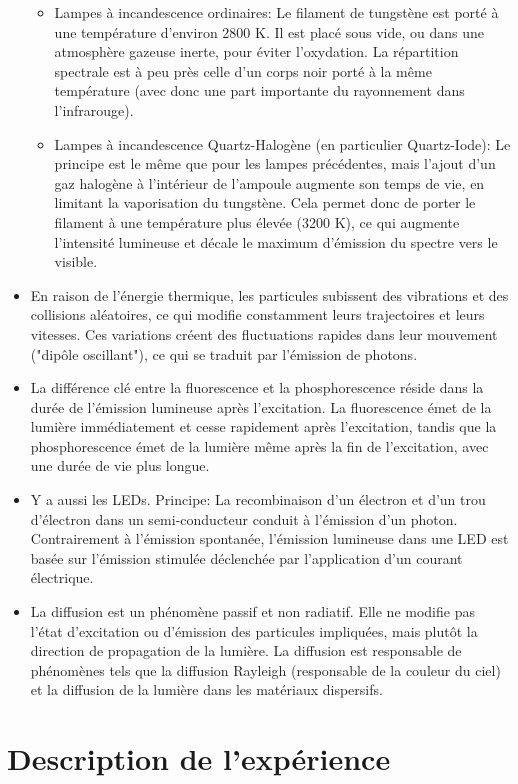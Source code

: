 \documentclass[11pt]{report}
\numberwithin{figure}{section}
\numberwithin{equation}{section}
\numberwithin{table}{section}
\newcommand{\1}{\boldsymbol{1}}
\begin{document}
\begin{itemize}
\begin{itemize}
\item Lampes à incandescence ordinaires: Le filament de tungstène est porté à une température d’environ 2800 K. Il est placé sous vide, ou dans une atmosphère gazeuse inerte, pour éviter l’oxydation. La répartition spectrale est à peu près celle d’un corps noir porté à la même température (avec donc une part importante du rayonnement dans l’infrarouge).
\item Lampes à incandescence Quartz-Halogène (en particulier Quartz-Iode): Le principe est le même que pour les lampes précédentes, mais l’ajout d’un gaz halogène à l’intérieur de l’ampoule augmente son temps de vie, en limitant la vaporisation du tungstène. Cela permet donc de porter le filament à une température plus élevée (3200 K), ce qui augmente l’intensité lumineuse et décale le maximum d’émission du spectre vers le visible.
\end{itemize}
\item En raison de l'énergie thermique, les particules subissent des vibrations et des collisions aléatoires, ce qui modifie constamment leurs trajectoires et leurs vitesses. Ces variations créent des fluctuations rapides dans leur mouvement ("dipôle oscillant"), ce qui se traduit par l'émission de photons.
\item La différence clé entre la fluorescence et la phosphorescence réside dans la durée de l'émission lumineuse après l'excitation. La fluorescence émet de la lumière immédiatement et cesse rapidement après l'excitation, tandis que la phosphorescence émet de la lumière même après la fin de l'excitation, avec une durée de vie plus longue.
\item Y a aussi les LEDs. Principe: La recombinaison d'un électron et d'un trou d'électron dans un semi-conducteur conduit à l'émission d'un photon. Contrairement à l'émission spontanée, l'émission lumineuse dans une LED est basée sur l'émission stimulée déclenchée par l'application d'un courant électrique.
\item La diffusion est un phénomène passif et non radiatif. Elle ne modifie pas l'état d'excitation ou d'émission des particules impliquées, mais plutôt la direction de propagation de la lumière. La diffusion est responsable de phénomènes tels que la diffusion Rayleigh (responsable de la couleur du ciel) et la diffusion de la lumière dans les matériaux dispersifs.
\end{itemize}

\section*{Description de l'expérience}
\end{document}
